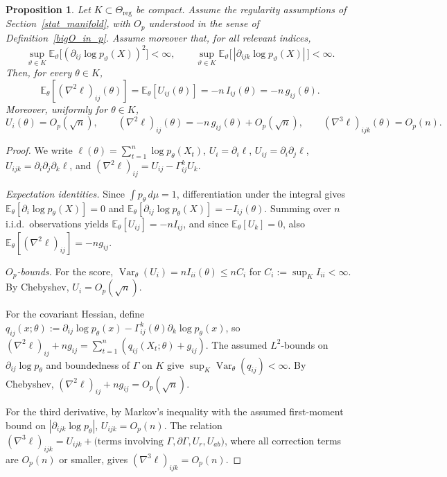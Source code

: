 \documentclass[11pt,letterpaper]{amsart}
\newcommand{\E}{\mathbb{E}}
\DeclareMathOperator{\Var}{Var}
\numberwithin{equation}{section}
\theoremstyle{plain}
\newtheorem{proposition}[theorem]{Proposition}
\theoremstyle{definition}
\theoremstyle{remark}
\begin{document}
\begin{proposition}\label{prop:score_hessian_orders}
Let \(K\subset \Theta_{\mathrm{reg}}\) be compact. Assume the regularity assumptions of Section~\ref{stat_manifold}, with \(O_p\) understood in the sense of Definition~\ref{bigO_in_p}. Assume moreover that, for all relevant indices,
\[
\sup_{\vartheta\in K}\E_\vartheta\!\big[(\partial_{ij}\log p_\vartheta(X))^2\big]<\infty,
\qquad
\sup_{\vartheta\in K}\E_\vartheta\!\big[\,|\partial_{ijk}\log p_\vartheta(X)|\,\big]<\infty.
\]
Then, for every \(\theta\in K\),
\[
\mathbb{E}_\theta[(\nabla^2\ell)_{ij}(\theta)]
=
\mathbb{E}_\theta[U_{ij}(\theta)]
=
-n\,I_{ij}(\theta)
=
-n\,g_{ij}(\theta).
\]
Moreover, uniformly for \(\theta\in K\),
\[
U_i(\theta)=O_p(\sqrt n),
\qquad
(\nabla^2\ell)_{ij}(\theta)
=
-n\,g_{ij}(\theta)+O_p(\sqrt n),
\qquad
(\nabla^3\ell)_{ijk}(\theta)=O_p(n).
\]
\end{proposition}
\begin{proof}
We write $\ell(\theta)=\sum_{t=1}^n \log p_\theta(X_t)$, $U_i=\partial_i\ell$, $U_{ij}=\partial_i\partial_j\ell$, $U_{ijk}=\partial_i\partial_j\partial_k\ell$, and $(\nabla^2\ell)_{ij}=U_{ij}-\Gamma_{ij}^kU_k$.

\textit{Expectation identities.} Since $\int p_\theta\,d\mu=1$, differentiation under the integral gives $\E_\theta[\partial_i\log p_\theta(X)]=0$ and $\E_\theta[\partial_{ij}\log p_\theta(X)]=-I_{ij}(\theta)$. Summing over $n$ i.i.d.\ observations yields $\E_\theta[U_{ij}]=-nI_{ij}$, and since $\E_\theta[U_k]=0$, also $\E_\theta[(\nabla^2\ell)_{ij}]=-ng_{ij}$.

\textit{$O_p$-bounds.} For the score, $\Var_\theta(U_i)=nI_{ii}(\theta)\le nC_i$ for $C_i:=\sup_{K}I_{ii}<\infty$. By Chebyshev, $U_i=O_p(\sqrt n)$.

For the covariant Hessian, define $q_{ij}(x;\theta):=\partial_{ij}\log p_\theta(x)-\Gamma_{ij}^k(\theta)\partial_k\log p_\theta(x)$, so $(\nabla^2\ell)_{ij}+ng_{ij}=\sum_{t=1}^n(q_{ij}(X_t;\theta)+g_{ij})$. The assumed $L^2$-bounds on $\partial_{ij}\log p_\theta$ and boundedness of $\Gamma$ on $K$ give $\sup_K\Var_\theta(q_{ij})<\infty$. By Chebyshev, $(\nabla^2\ell)_{ij}+ng_{ij}=O_p(\sqrt n)$.

For the third derivative, by Markov's inequality with the assumed first-moment bound on $|\partial_{ijk}\log p_\theta|$, $U_{ijk}=O_p(n)$. The relation $(\nabla^3\ell)_{ijk}=U_{ijk}+\text{(terms involving }\Gamma,\partial\Gamma,U_r,U_{ab}\text{)}$, where all correction terms are $O_p(n)$ or smaller, gives $(\nabla^3\ell)_{ijk}=O_p(n)$.
\end{proof}
\end{document}
